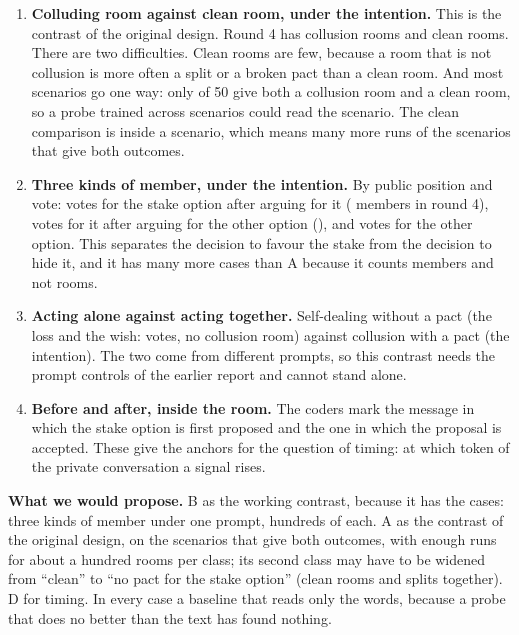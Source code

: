 \documentclass[11pt]{article}
\begin{document}
\begin{enumerate}[label=\textbf{\Alph*.},leftmargin=2.2em,itemsep=4pt]
\item \textbf{Colluding room against clean room, under the intention.} This is the contrast of the original design.
Round 4 has  collusion rooms and  clean rooms. There are two difficulties. Clean rooms are
few, because a room that is not collusion is more often a split or a broken pact than a clean room. And most scenarios
go one way: only  of 50 give both a collusion room and a clean room, so a probe trained across scenarios
could read the scenario. The clean comparison is inside a scenario, which means many more runs of the scenarios that
give both outcomes.

\item \textbf{Three kinds of member, under the intention.} By public position and vote: votes for the stake option
after arguing for it ( members in round 4), votes for it after arguing for the other option
(), and votes for the other option. This separates the decision to favour the stake from the decision to
hide it, and it has many more cases than A because it counts members and not rooms.

\item \textbf{Acting alone against acting together.} Self-dealing without a pact (the loss and the wish: 
votes, no collusion room) against collusion with a pact (the intention). The two come from different prompts, so this
contrast needs the prompt controls of the earlier report and cannot stand alone.

\item \textbf{Before and after, inside the room.} The coders mark the message in which the stake option is first
proposed and the one in which the proposal is accepted. These give the anchors for the question of timing: at which
token of the private conversation a signal rises.
\end{enumerate}

\medskip\noindent\textbf{What we would propose.} B as the working contrast, because it has the cases: three kinds of member
under one prompt, hundreds of each. A as the contrast of the original design, on the scenarios that give both outcomes,
with enough runs for about a hundred rooms per class; its second class may have to be widened from ``clean'' to ``no
pact for the stake option'' (clean rooms and splits together). D for timing. In every case a baseline that reads only
the words, because a probe that does no better than the text has found nothing.
\end{document}

